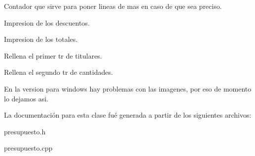 Contador que sirve para poner lineas de mas en caso de que sea preciso.

Impresion de los descuentos.

Impresion de los totales.

Rellena el primer tr de titulares.

Rellena el segundo tr de cantidades.

En la version para windows hay problemas con las imagenes, por eso de momento lo dejamos asi. 

La documentaci\'{o}n para esta clase fu\'{e} generada a partir de los siguientes archivos:\begin{CompactItemize}
\item 
presupuesto.h\item 
presupuesto.cpp\end{CompactItemize}
